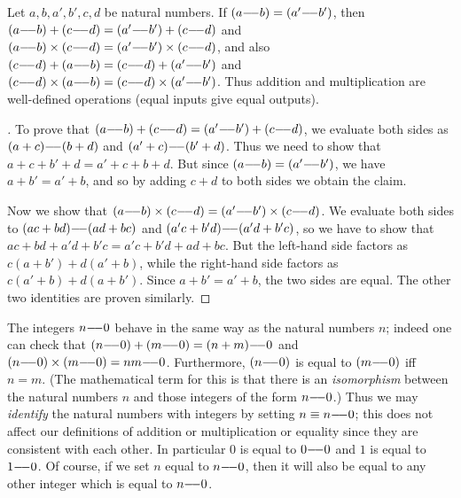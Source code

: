 \begin{lem}\label{4.1.3}
  Let \(a, b, a', b', c, d\) be natural numbers.
  If \((a {-}\!{-} b) = (a' {-}\!{-} b')\), then \((a {-}\!{-} b) + (c {-}\!{-} d) = (a' {-}\!{-} b') + (c {-}\!{-} d)\) and \((a {-}\!{-} b) \times (c {-}\!{-} d) = (a' {-}\!{-} b') \times (c {-}\!{-} d)\), and also \((c {-}\!{-} d) + (a {-}\!{-} b) = (c {-}\!{-} d) + (a' {-}\!{-} b')\) and \((c {-}\!{-} d) \times (a {-}\!{-} b) = (c {-}\!{-} d) \times (a' {-}\!{-} b')\).
  Thus addition and multiplication are well-defined operations (equal inputs give equal outputs).
\end{lem}

\begin{proof}[]
  To prove that \((a {-}\!{-} b) + (c {-}\!{-} d) = (a' {-}\!{-} b') + (c {-}\!{-} d)\), we evaluate both sides as \((a + c) {-}\!{-} (b + d)\) and \((a' + c) {-}\!{-} (b' + d)\).
  Thus we need to show that \(a + c + b' + d = a' + c + b + d\).
  But since \((a {-}\!{-} b) = (a' {-}\!{-} b')\), we have \(a + b' = a' + b\), and so by adding \(c + d\) to both sides we obtain the claim.

  Now we show that \((a {-}\!{-} b) \times (c {-}\!{-} d) = (a' {-}\!{-} b') \times (c {-}\!{-} d)\).
  We evaluate both sides to \((ac + bd) {-}\!{-} (ad + bc)\) and \((a'c + b'd) {-}\!{-} (a'd + b'c)\), so we have to show that \(ac + bd + a'd + b'c = a'c + b'd + ad + bc\).
  But the left-hand side factors as \(c(a + b') + d(a' + b)\), while the right-hand side factors as \(c(a' + b) + d(a + b')\).
  Since \(a + b' = a' + b\), the two sides are equal.
  The other two identities are proven similarly.
\end{proof}

\begin{ac}\label{ac:4.1.2}
  The integers \(n {-}\!{-} 0\) behave in the same way as the natural numbers \(n\);
  indeed one can check that \((n {-}\!{-} 0) + (m {-}\!{-} 0) = (n + m) {-}\!{-} 0\) and \((n {-}\!{-} 0) \times (m {-}\!{-} 0) = nm {-}\!{-} 0\).
  Furthermore, \((n {-}\!{-} 0)\) is equal to \((m {-}\!{-} 0)\) iff \(n = m\).
  (The mathematical term for this is that there is an \emph{isomorphism} between the natural numbers \(n\) and those integers of the form \(n {-}\!{-} 0\).)
  Thus we may \emph{identify} the natural numbers with integers by setting \(n \equiv n {-}\!{-} 0\);
  this does not affect our definitions of addition or multiplication or equality since they are consistent with each other.
  In particular \(0\) is equal to \(0 {-}\!{-} 0\) and \(1\) is equal to \(1 {-}\!{-} 0\).
  Of course, if we set \(n\) equal to \(n {-}\!{-} 0\), then it will also be equal to any other integer which is equal to \(n {-}\!{-} 0\).
\end{ac}

